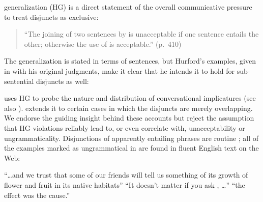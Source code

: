 \documentclass[12pt,twoside]{article}
\renewcommand{\_}{\textbf{\textunderscore\hspace{-4pt}\textunderscore\hspace{-3pt}\textunderscore\hspace{-4pt}\textunderscore}\hspace{0.5pt}}			%
\begin{document}
 generalization (HG) is a direct statement of
the overall communicative pressure to treat disjuncts as exclusive:
%
\begin{quote}
  ``The joining of two sentences by  is unacceptable if one
  sentence entails the other; otherwise the use of  is
  acceptable.'' (p.~410)
\end{quote}
%
The generalization is stated in terms of sentences, but Hurford's
examples, given in  with his original judgments, make it clear
that he intends it to hold for sub-sentential disjuncts as well:
%
\begin{exe}
\ex\label{hex}
  \begin{xlist}
  \end{xlist}
\end{exe}

\citeauthor{Hurford:1974} uses HG to probe the nature and distribution
of conversational implicatures (see also
\citealt{Gazdar79b,ChierchiaFoxSpector08}). \citet{Singh:2008} extends
it to certain cases in which the disjuncts are merely overlapping. We
endorse the guiding insight behind these accounts but reject the
assumption that HG violations reliably lead to, or even correlate
with, unacceptability or ungrammaticality. Disjunctions of apparently
entailing phrases are routine \citep{Simons:2001}; all of the examples
marked as ungrammatical in  are found in fluent English text
on the Web:
%
\begin{exe}
\ex\label{hex-good}
  \begin{xlist}
  \ex ``\ldots and we trust that some of our  friends will tell us something of its growth of
    flower and fruit in its native habitats''
  \ex ``It doesn't matter if you ask , \ldots''
  \ex ``the effect was 
    the cause.''
  \end{xlist}
\end{exe}
\end{document}
